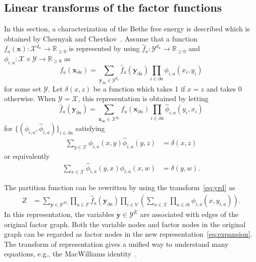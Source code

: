 \documentclass[a4paper,10pt,twoside,twocolumn,openany,final]{memoir}
\theoremstyle{plain}
\theoremstyle{definition}
\theoremstyle{remark}
\begin{document}
\subsection{Linear transforms of the factor functions}
In this section, a characterization of the Bethe free energy is described which is obtained by Chernyak and Chertkov~\cite{chernyak2007loop}.
Assume that a function $f_a(\bm{x}):\mathcal{X}^{d_a}\to\mathbb{R}_{\ge 0}$ is represented by using
$\hat{f}_a: \mathcal{Y}^{d_a}\to\mathbb{R}_{\ge 0}$ and $\phi_{i,a}:\mathcal{X}\times\mathcal{Y}\to\mathbb{R}_{\ge 0}$ as 
\begin{equation}
f_a(\bm{x}_{\partial a})
= \sum_{\bm{y}_{\partial a}\in\mathcal{Y}^{d_a}}
\hat{f}_a(\bm{y}_{\partial a}) \prod_{i\in\partial a} \phi_{i,a}(x_i, y_i)
\label{eq:yrd}
\end{equation}
for some set $\mathcal{Y}$.
Let $\delta(x,z)$ be a function which takes 1 if $x=z$ and takes 0 otherwise.
When $\mathcal{Y}=\mathcal{X}$, this representation is obtained by letting
\begin{equation*}
\hat{f}_a(\bm{y}_{\partial a})
= \sum_{\bm{x}_{\partial a}\in\mathcal{X}^{d_a}}
f_a(\bm{x}_{\partial a}) \prod_{i\in\partial a} \hat{\phi}_{i,a}(y_i, x_i)
\end{equation*}
for $\{(\phi_{i,a},\hat{\phi}_{i,a})\}_{i\in\partial a}$ satisfying
\begin{align*}
\sum_{y\in\mathcal{X}} \phi_{i,a}(x,y)\hat{\phi}_{i,a}(y,z) &= \delta(x,z)
\end{align*}
or equivalently
\begin{align}
\sum_{x\in\mathcal{X}} \hat{\phi}_{i,a}(y,x)\phi_{i,a}(x,w) &= \delta(y,w).
\label{eq:inverse1}
\end{align}


The partition function can be rewritten by using the transform~\eqref{eq:yrd} as
\begin{align}
Z 
&= \sum_{\bm{y}\in\mathcal{Y}^{|E|}} \prod_{a\in F} \hat{f}_a(\bm{y}_{\partial a})
\prod_{i\in V} \left(\sum_{x\in\mathcal{X}} \prod_{a\in\partial i} \phi_{i,a}(x,y_{i,a})\right).
\label{eq:expansion}
\end{align}
In this representation, the variables $\bm{y}\in\mathcal{Y}^E$ are associated with edges of the original factor graph.
Both the variable nodes and factor nodes in the original graph can be regarded as factor nodes in the new representation~\eqref{eq:expansion}.
The transform of representation gives a unified way to understand many equations, e.g., the MacWilliams identity~\cite{forney2011partition}.
\end{document}
